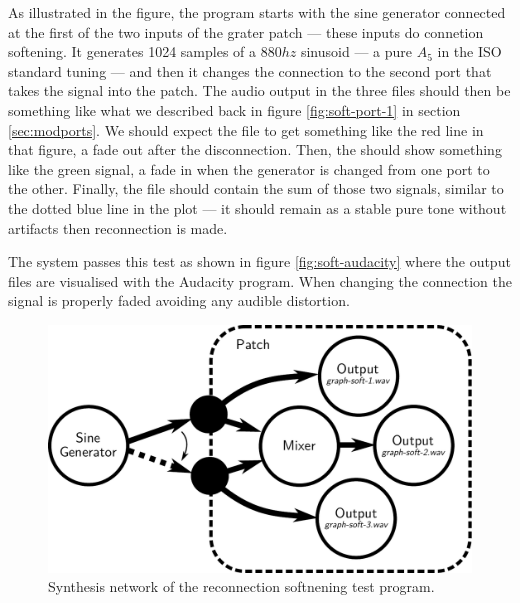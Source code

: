 \begin{description}
  As illustrated in the figure, the program starts with the sine
  generator connected at the first of the two inputs of the grater
  patch --- these inputs do connetion softening. It generates 1024
  samples of a $880 hz$ sinusoid --- a pure $A_5$ in the ISO standard
  tuning \cite{pitchstd} --- and then it changes the connection to the second port
  that takes the signal into the patch. The audio output in the three
  files should then be something like what we described back in figure
  \ref{fig:soft-port-1} in section \ref{sec:modports}. We should
  expect the  file to get something like the
  red line in that figure, a fade out after the disconnection. Then,
  the  should show something like the green
  signal, a fade in when the generator is changed from one port to the
  other. Finally, the  file should contain the
  sum of those two signals, similar to the dotted blue line in the
  plot --- it should remain as a stable pure tone without artifacts
  then reconnection is made.

  The system passes this test as shown in figure
  \ref{fig:soft-audacity} where the output files are visualised
  with the Audacity program. When changing the connection the signal
  is properly faded avoiding any audible distortion.
\end{description}

\begin{figure}[h!]
  \centering
  \includegraphics[width=\textwidth]{pic/graph-soft.pdf}
  \caption{Synthesis network of the reconnection softnening test
    program.}
  \label{fig:examplegraphsoft}
\end{figure}

